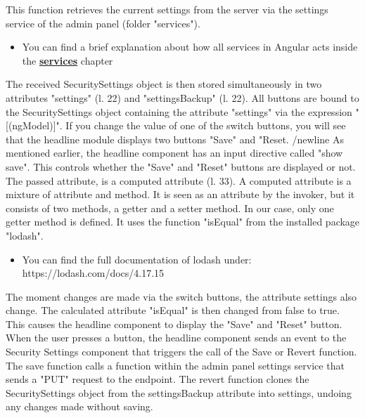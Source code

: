 This function retrieves the current settings from the server via the settings service of the admin panel (folder "services").
\begin{itemize}
    \item You can find a brief explanation about how all services in Angular acts inside the \hyperref[subsec:services]{\textbf{services}} chapter
\end{itemize}
The received SecuritySettings object is then stored simultaneously in two attributes "settings" (l. 22) and "settingsBackup" (l. 22).
All buttons are bound to the SecuritySettings object containing the attribute "settings" via the expression "[(ngModel)]".
If you change the value of one of the switch buttons, you will see that the headline module displays two buttons "Save" and "Reset. /newline As mentioned earlier, the headline component has an input directive called "show save". This controls whether the "Save" and "Reset" buttons are displayed or not. The passed attribute, is a computed attribute (l. 33). A computed attribute is a mixture of attribute and method. It is seen as an attribute by the invoker, but it consists of two methods, a getter and a setter method. In our case, only one getter method is defined.
It uses the function "isEqual" from the installed package "lodash".
\begin{itemize}
    \item You can find the full documentation of lodash under: https://lodash.com/docs/4.17.15
\end{itemize}
The moment changes are made via the switch buttons, the attribute settings also change. The calculated attribute "isEqual" is then changed from false to true. This causes the headline component to display the "Save" and "Reset" button. When the user presses a button, the headline component sends an event to the Security Settings component that triggers the call of the Save or Revert function. \\
The save function calls a function within the admin panel settings service that sends a "PUT" request to the endpoint.
The revert function clones the SecuritySettings object from the settingsBackup attribute into settings, undoing any changes made without saving.


